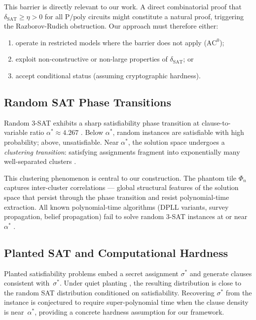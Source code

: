 \documentclass[11pt]{article}
\theoremstyle{definition}
\theoremstyle{remark}
\newcommand{\Ppoly}{\mathrm{P/poly}}
\newcommand{\ACz}{\mathrm{AC}^0}
\newcommand{\dSAT}{\delta_{\mathrm{SAT}}}
\begin{document}
This barrier is directly relevant to our work.  A direct combinatorial
proof that $\dSAT \geq \eta > 0$ for all $\Ppoly$ circuits might
constitute a natural proof, triggering the Razborov-Rudich obstruction.
Our approach must therefore either:
\begin{enumerate}[label=(\alph*)]
  \item operate in restricted models where the barrier does not apply ($\ACz$);
  \item exploit non-constructive or non-large properties of $\dSAT$; or
  \item accept conditional status (assuming cryptographic hardness).
\end{enumerate}

\subsection{Random SAT Phase Transitions}

Random 3-SAT exhibits a sharp satisfiability phase transition at
clause-to-variable ratio $\alpha^* \approx 4.267$ \cite{MPZ, DSS15}.
Below $\alpha^*$, random instances are satisfiable with high probability;
above, unsatisfiable.  Near $\alpha^*$, the solution space undergoes
a \emph{clustering transition}: satisfying assignments fragment into
exponentially many well-separated clusters \cite{ART, Ding15}.

This clustering phenomenon is central to our construction.  The phantom
tile $\Phi_n$ captures inter-cluster correlations --- global structural
features of the solution space that persist through the phase transition
and resist polynomial-time extraction.  All known polynomial-time
algorithms (DPLL variants, survey propagation, belief propagation) fail
to solve random 3-SAT instances at or near $\alpha^*$ \cite{MPZ}.

\subsection{Planted SAT and Computational Hardness}

Planted satisfiability problems embed a secret assignment $\sigma^*$
and generate clauses consistent with~$\sigma^*$.  Under quiet planting
\cite{planted}, the resulting distribution is close to the random SAT
distribution conditioned on satisfiability.  Recovering $\sigma^*$ from
the instance is conjectured to require super-polynomial time when the
clause density is near~$\alpha^*$, providing a concrete hardness
assumption for our framework.
\end{document}
